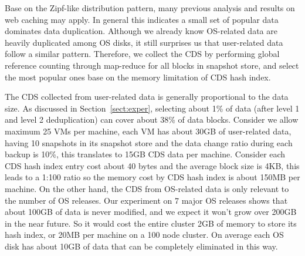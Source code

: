 Base on the Zipf-like distribution pattern, many previous analysis and results on web caching\cite{Adamic2002,Breslau1999b} may apply.
In general this indicates a small set of popular data dominates data duplication.
Although we already know OS-related data are heavily duplicated among OS disks, 
it still surprises us that user-related data follow a similar pattern.
Therefore, we collect the CDS by performing global reference counting through map-reduce for all
blocks in snapshot store, and select the most popular ones base on the memory limitation of
CDS hash index. 

The CDS collected from user-related data is generally proportional to the data size.
As discussed in Section~\ref{sect:exper}, selecting about 1\% of data (after level 1 and level 2 deduplication)
can cover about 38\% of data blocks. Consider we allow maximum 25 VMs per machine, each VM has
about 30GB of user-related data, having 10 snapshots in its snapshot store and the data change ratio during
each backup is 10\%, this translates to 15GB CDS data per machine. 
Consider each CDS hash index entry cost about 40 bytes and the average block size is 4KB, this leads to
a 1:100 ratio so the 
memory cost by CDS hash index is about 150MB per machine.
On the other hand, the CDS from OS-related data is only relevant to the number of OS releases.
Our experiment on 7 major OS releases shows that about 100GB of data is never modified, and we expect
it won't grow over 200GB in the near future. So it would cost the entire cluster 2GB of memory to
store its hash index, or 20MB per machine on a 100 node cluster. On average each OS disk has about 10GB
of data that can be completely eliminated in this way.
